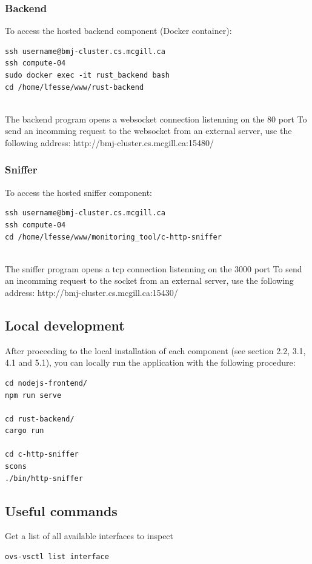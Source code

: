 \documentclass[12pt,hidelinks]{article}
\begin{document}
\subsubsection{Backend}
To access the hosted backend component (Docker container):
\begin{verbatim}
ssh username@bmj-cluster.cs.mcgill.ca
ssh compute-04
sudo docker exec -it rust_backend bash
cd /home/lfesse/www/rust-backend
\end{verbatim}
\\
The backend program opens a websocket connection listenning on the 80 port
To send an incomming request to the websocket from an external server, use the following address: http://bmj-cluster.cs.mcgill.ca:15480/

\subsubsection{Sniffer}
To access the hosted sniffer component: 
    \begin{verbatim}
ssh username@bmj-cluster.cs.mcgill.ca
ssh compute-04
cd /home/lfesse/www/monitoring_tool/c-http-sniffer 	
\end{verbatim}
\\
The sniffer program opens a tcp connection listenning on the 3000 port
To send an incomming request to the socket from an external server, use the following address: http://bmj-cluster.cs.mcgill.ca:15430/

\subsection{Local development}

After proceeding to the local installation of each component (see section 2.2, 3.1, 4.1 and 5.1), you can locally run the application with the following procedure:
\begin{verbatim}
cd nodejs-frontend/
npm run serve

cd rust-backend/
cargo run

cd c-http-sniffer
scons
./bin/http-sniffer

\end{verbatim}

	
\subsection{Useful commands}
Get a list of all available interfaces to inspect
\begin{verbatim}
ovs-vsctl list interface  
\end{verbatim}
\end{document}

